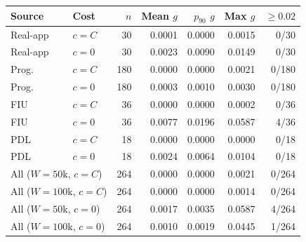 \begin{tabular}{llrrrrr}
\toprule
Source & Cost & $n$ & Mean $g$ & $p_{90}$ $g$ & Max $g$ & $\ge 0.02$ \\
\midrule
Real-app & $c=C$ & 30 & 0.0001 & 0.0000 & 0.0015 & 0/30 \\
Real-app & $c=0$ & 30 & 0.0023 & 0.0090 & 0.0149 & 0/30 \\
Prog. & $c=C$ & 180 & 0.0000 & 0.0000 & 0.0021 & 0/180 \\
Prog. & $c=0$ & 180 & 0.0003 & 0.0010 & 0.0030 & 0/180 \\
FIU & $c=C$ & 36 & 0.0000 & 0.0000 & 0.0002 & 0/36 \\
FIU & $c=0$ & 36 & 0.0077 & 0.0196 & 0.0587 & 4/36 \\
PDL & $c=C$ & 18 & 0.0000 & 0.0000 & 0.0000 & 0/18 \\
PDL & $c=0$ & 18 & 0.0024 & 0.0064 & 0.0104 & 0/18 \\
\midrule
\multicolumn{2}{l}{All ($W=50$k, $c=C$)} & 264 & 0.0000 & 0.0000 & 0.0021 & 0/264 \\
\multicolumn{2}{l}{All ($W=100$k, $c=C$)} & 264 & 0.0000 & 0.0000 & 0.0014 & 0/264 \\
\multicolumn{2}{l}{All ($W=50$k, $c=0$)} & 264 & 0.0017 & 0.0035 & 0.0587 & 4/264 \\
\multicolumn{2}{l}{All ($W=100$k, $c=0$)} & 264 & 0.0010 & 0.0019 & 0.0445 & 1/264 \\
\bottomrule
\end{tabular}
